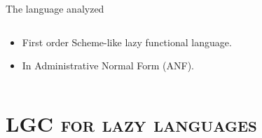 \documentclass[xcolor=x11names,compress,mathserif]{beamer}
\renewcommand{\(}{\begin{columns}}
\renewcommand{\)}{\end{columns}}
\newcommand{\<}[1]{\begin{column}{#1}}
\renewcommand{\>}{\end{column}}
\begin{document}
\begin{frame}{The language analyzed}
\begin{columns}
  \begin{column}[T]{0.45\textwidth}
\small
    \begin{itemize} \itemsep0.75em
    \item First order Scheme-like lazy functional language.
    \item In Administrative Normal Form (ANF).
    \end{itemize}
\normalsize
  \end{column}
  \begin{column}[T]{0.55\textwidth}
    
  \end{column}
\end{columns}
\end{frame}
\section{\scshape LGC for lazy languages}

\end{document}
